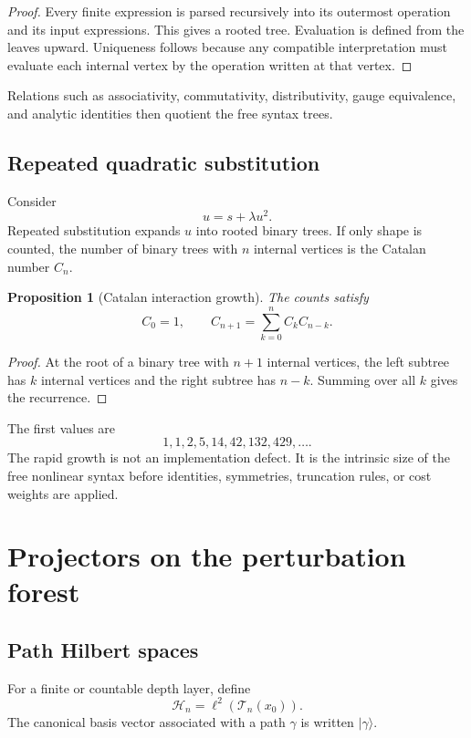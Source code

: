 \documentclass[11pt,openany]{report}
\newtheorem{proposition}[theorem]{Proposition}
\theoremstyle{definition}
\theoremstyle{remark}
\newcommand{\Tcal}{\mathcal T}
\begin{document}
\begin{proof}
Every finite expression is parsed recursively into its outermost operation and its input expressions. This gives a rooted tree. Evaluation is defined from the leaves upward. Uniqueness follows because any compatible interpretation must evaluate each internal vertex by the operation written at that vertex.
\end{proof}

Relations such as associativity, commutativity, distributivity, gauge equivalence, and analytic identities then quotient the free syntax trees.

\section{Repeated quadratic substitution}

Consider
\[
u=s+\lambda u^2.
\]
Repeated substitution expands $u$ into rooted binary trees. If only shape is counted, the number of binary trees with $n$ internal vertices is the Catalan number $C_n$.

\begin{proposition}[Catalan interaction growth]
The counts satisfy
\[
C_0=1,
\qquad
C_{n+1}=\sum_{k=0}^nC_kC_{n-k}.
\]
\end{proposition}

\begin{proof}
At the root of a binary tree with $n+1$ internal vertices, the left subtree has $k$ internal vertices and the right subtree has $n-k$. Summing over all $k$ gives the recurrence.
\end{proof}

The first values are
\[
1,1,2,5,14,42,132,429,\ldots.
\]
The rapid growth is not an implementation defect. It is the intrinsic size of the free nonlinear syntax before identities, symmetries, truncation rules, or cost weights are applied.

\chapter{Projectors on the perturbation forest}

\section{Path Hilbert spaces}

For a finite or countable depth layer, define
\[
\mathcal H_n=\ell^2(\Tcal_n(x_0)).
\]
The canonical basis vector associated with a path $\gamma$ is written $\lvert\gamma\rangle$.
\end{document}
